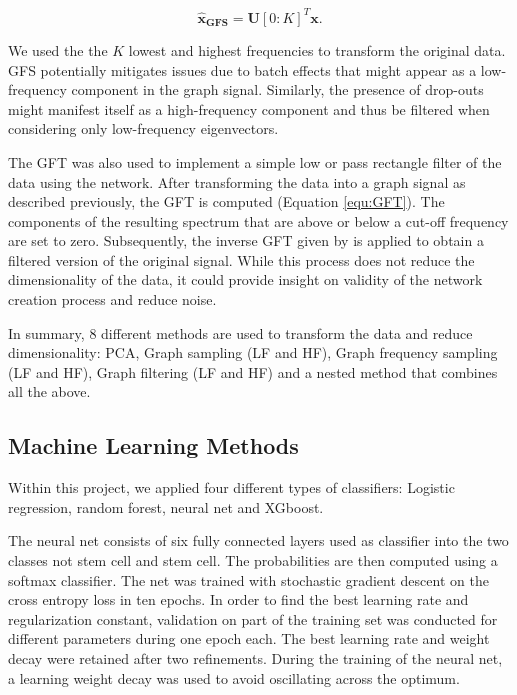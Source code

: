 \documentclass[10pt,conference,compsocconf]{IEEEtran}
\begin{document}
\begin{equation}
\boldsymbol{\hat{x}_{GFS}} = \boldsymbol{U}[0:K]^T \boldsymbol{x}.
\end{equation} 
\par
We used the the $K$ lowest and highest frequencies to transform the original data. GFS potentially mitigates issues due to batch effects that might appear as a low-frequency component in the graph signal. Similarly, the presence of drop-outs might manifest itself as a high-frequency component and thus be filtered when considering only low-frequency eigenvectors.\\
\par
The GFT was also used to implement a simple low or pass rectangle filter of the data using the network. After transforming the data into a graph signal as described previously, the GFT is computed (Equation \ref{equ:GFT}). The components of the resulting spectrum that are above or below a cut-off frequency are set to zero. Subsequently, the inverse GFT given by is applied to obtain a filtered version of the original signal. While this process does not reduce the dimensionality of the data, it could provide insight on validity of the network creation process and reduce noise.
\par
In summary, 8 different methods are used to transform the data and reduce dimensionality: PCA, Graph sampling (LF and HF), Graph frequency sampling (LF and HF), Graph filtering (LF and HF) and a nested method that combines all the above.

\subsection{Machine Learning Methods}
Within this project, we applied four different types of classifiers: Logistic regression, random forest, neural net and XGboost.
\par

The neural net consists of six fully connected layers used as classifier into the two classes not stem cell and stem cell. The probabilities are then computed using a softmax classifier. The net was trained with stochastic gradient descent on the cross entropy loss in ten epochs. In order to find the best learning rate and regularization constant, validation on part of the training set was conducted for different parameters during one epoch each. The best learning rate and weight decay were retained after two refinements. During the training of the neural net, a learning weight decay was used to avoid oscillating across the optimum.
\end{document}
